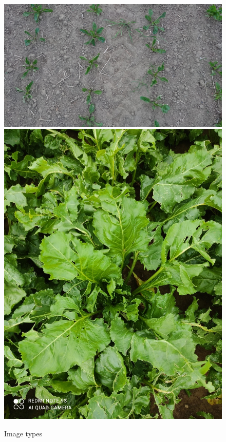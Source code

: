 \begin{figure}[htb!]
	\centering
	\includegraphics[scale=0.15]{figures/image_type1.JPG}
	\hspace{40pt}
	\includegraphics[scale=0.15]{figures/image_type2.jpg}
	\caption{Image types}
	\label{fig:image_types}
\end{figure}

